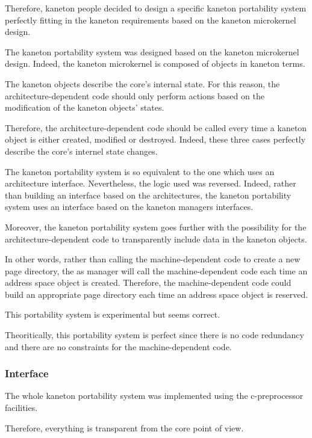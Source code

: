 Therefore, kaneton people decided to design a specific kaneton portability
system perfectly fitting in the kaneton requirements based on the kaneton
microkernel design.

The kaneton portability system was designed based on the kaneton microkernel
design. Indeed, the kaneton microkernel is composed of objects in
kaneton terms.

The kaneton objects describe the core's internal state. For this reason,
the architecture-dependent code should only perform actions based on
the modification of the kaneton objects' states.

Therefore, the architecture-dependent code should be called every time
a kaneton object is either created, modified or destroyed. Indeed, these
three cases perfectly describe the core's internel state changes.

The kaneton portability system is so equivalent to the one which uses
an architecture interface. Nevertheless, the logic used was reversed.
Indeed, rather than building an interface based on the architectures, the
kaneton portability system uses an interface based on the kaneton managers
interfaces.

Moreover, the kaneton portability system goes further with the possibility
for the architecture-dependent code to transparently include data in the
kaneton objects.

In other words, rather than calling the machine-dependent code to create
a new page directory, the as manager will call the machine-dependent code
each time an address space object is created. Therefore, the
machine-dependent code could build an appropriate page directory each time
an address space object is reserved.

This portability system is experimental but seems correct.

Theoritically, this portability system is perfect since there is no
code redundancy and there are no constraints for the machine-dependent
code.

%
%

\subsubsection{Interface}

The whole kaneton portability system was implemented using the
c-preprocessor facilities.

Therefore, everything is transparent from the core point of view.

